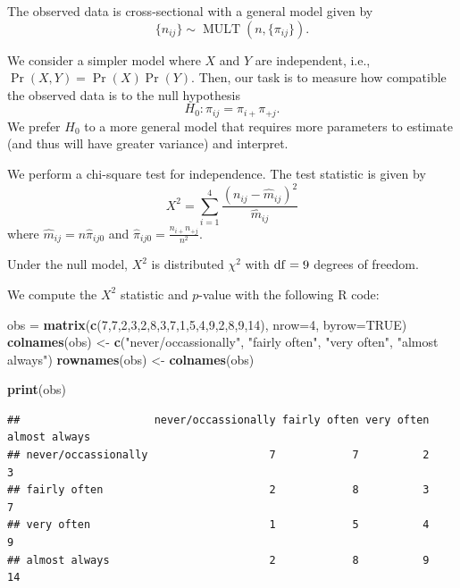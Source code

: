 \documentclass[
]{article}
\newenvironment{Shaded}{\begin{snugshade}}{\end{snugshade}}
\newcommand{\AttributeTok}[1]{\textcolor[rgb]{0.13,0.29,0.53}{#1}}
\newcommand{\ConstantTok}[1]{\textcolor[rgb]{0.56,0.35,0.01}{#1}}
\newcommand{\DecValTok}[1]{\textcolor[rgb]{0.00,0.00,0.81}{#1}}
\newcommand{\FunctionTok}[1]{\textcolor[rgb]{0.13,0.29,0.53}{\textbf{#1}}}
\newcommand{\NormalTok}[1]{#1}
\newcommand{\OtherTok}[1]{\textcolor[rgb]{0.56,0.35,0.01}{#1}}
\newcommand{\StringTok}[1]{\textcolor[rgb]{0.31,0.60,0.02}{#1}}
\begin{document}
The observed data is cross-sectional with a general model given by \[
  \{n_{i j}\} \sim \operatorname{MULT}(n, \{\pi_{i j}\}).
\]

We consider a simpler model where \(X\) and \(Y\) are independent, i.e.,
\(\Pr(X,Y) = \Pr(X)\Pr(Y)\). Then, our task is to measure how compatible
the observed data is to the null hypothesis \[
  H_0 : \pi_{i j} = \pi_{i+}\pi_{+j}.
\] We prefer \(H_0\) to a more general model that requires more
parameters to estimate (and thus will have greater variance) and
interpret.

We perform a chi-square test for independence. The test statistic is
given by \[
  X^2 = \sum_{i=1}^{4} \frac{(n_{i j} - \hat{m}_{i j})^2}{\hat{m}_{i j}}
\] where \(\hat{m}_{i j} = n \hat{\pi}_{i j 0}\) and
\(\hat{\pi}_{i j 0} = \frac{n_{i+}n_{+j}}{n^2}\).

Under the null model, \(X^2\) is distributed \(\chi^2\) with
\(\rm{df} = 9\) degrees of freedom.

We compute the \(X^2\) statistic and \(p\)-value with the following R
code:

\begin{Shaded}
\begin{Highlighting}[]
\NormalTok{obs }\OtherTok{=} \FunctionTok{matrix}\NormalTok{(}\FunctionTok{c}\NormalTok{(}\DecValTok{7}\NormalTok{,}\DecValTok{7}\NormalTok{,}\DecValTok{2}\NormalTok{,}\DecValTok{3}\NormalTok{,}\DecValTok{2}\NormalTok{,}\DecValTok{8}\NormalTok{,}\DecValTok{3}\NormalTok{,}\DecValTok{7}\NormalTok{,}\DecValTok{1}\NormalTok{,}\DecValTok{5}\NormalTok{,}\DecValTok{4}\NormalTok{,}\DecValTok{9}\NormalTok{,}\DecValTok{2}\NormalTok{,}\DecValTok{8}\NormalTok{,}\DecValTok{9}\NormalTok{,}\DecValTok{14}\NormalTok{), }\AttributeTok{nrow=}\DecValTok{4}\NormalTok{, }\AttributeTok{byrow=}\ConstantTok{TRUE}\NormalTok{)}
\FunctionTok{colnames}\NormalTok{(obs) }\OtherTok{\textless{}{-}} \FunctionTok{c}\NormalTok{(}\StringTok{"never/occassionally"}\NormalTok{, }\StringTok{"fairly often"}\NormalTok{, }\StringTok{"very often"}\NormalTok{, }\StringTok{"almost always"}\NormalTok{)}
\FunctionTok{rownames}\NormalTok{(obs) }\OtherTok{\textless{}{-}} \FunctionTok{colnames}\NormalTok{(obs)}

\FunctionTok{print}\NormalTok{(obs)}
\end{Highlighting}
\end{Shaded}

\begin{verbatim}
##                     never/occassionally fairly often very often almost always
## never/occassionally                   7            7          2             3
## fairly often                          2            8          3             7
## very often                            1            5          4             9
## almost always                         2            8          9            14
\end{verbatim}
\end{document}
